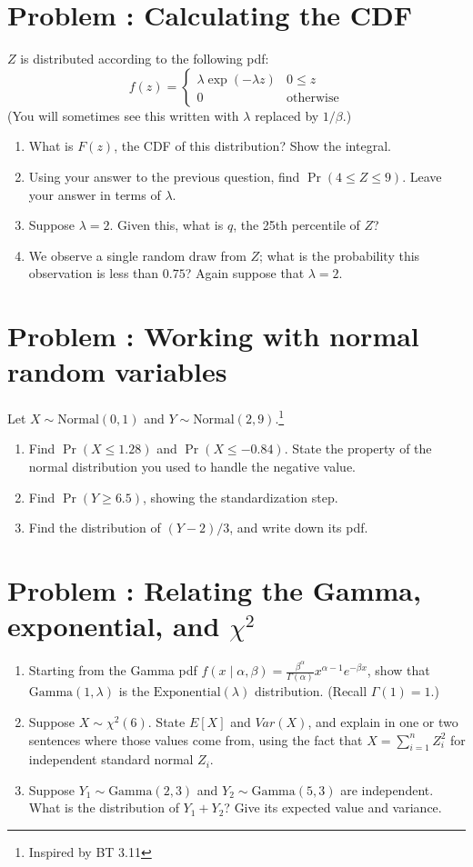 \documentclass[11pt]{article}
\newcounter{problem}
\newcommand{\problem}[1]{\stepcounter{problem}\section*{Problem \theproblem: #1}}
\begin{document}
\problem{Calculating the CDF}

$Z$ is distributed according to the following pdf:
$$
f(z) = \begin{cases}
\lambda \exp(-\lambda z) &  0 \le z \\
0 & \text{otherwise}
\end{cases}
$$
(You will sometimes see this written with $\lambda$ replaced by
$1/\beta$.)

\begin{enumerate}[label=\alph*.]
\item What is $F(z)$, the CDF of this distribution? Show the
  integral.
\item Using your answer to the previous question, find
  $\Pr(4 \leq Z \leq 9)$. Leave your answer in terms of $\lambda$.
\item Suppose $\lambda = 2$. Given this, what is $q$, the 25th
  percentile of $Z$?
\item We observe a single random draw from $Z$; what is the
  probability this observation is less than $0.75$? Again suppose
  that $\lambda = 2$.
\end{enumerate}

\problem{Working with normal random variables}

Let $X \sim \text{Normal}(0, 1)$ and
$Y \sim \text{Normal}(2, 9)$.\footnote{Inspired by BT 3.11}

\begin{enumerate}[label=\alph*.]
\item Find $\Pr(X \leq 1.28)$ and $\Pr(X \leq -0.84)$. State the
  property of the normal distribution you used to handle the negative
  value.
\item Find $\Pr(Y \geq 6.5)$, showing the standardization step.
\item Find the distribution of $(Y - 2)/3$, and write down its pdf.
\end{enumerate}

\problem{Relating the Gamma, exponential, and $\chi^2$}

\begin{enumerate}[label=\alph*.]
\item Starting from the Gamma pdf
  $f(x \mid \alpha, \beta) = \frac{\beta^{\alpha}}{\Gamma(\alpha)}
  x^{\alpha - 1} e^{-\beta x}$, show that
  $\text{Gamma}(1, \lambda)$ is the $\text{Exponential}(\lambda)$
  distribution. (Recall $\Gamma(1) = 1$.)
\item Suppose $X \sim \chi^2(6)$. State $E[X]$ and $Var(X)$, and
  explain in one or two sentences where those values come from, using
  the fact that $X = \sum_{i=1}^{n} Z_i^2$ for independent standard
  normal $Z_i$.
\item Suppose $Y_1 \sim \text{Gamma}(2, 3)$ and
  $Y_2 \sim \text{Gamma}(5, 3)$ are independent. What is the
  distribution of $Y_1 + Y_2$? Give its expected value and variance.
\end{enumerate}
\end{document}
